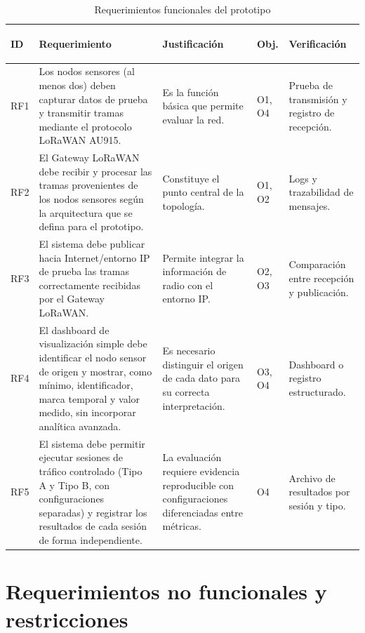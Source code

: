 \documentclass[12pt,oneside,openany,spanish,oldfontcommands]{memoir}
\begin{document}
\begin{table}[H]
\centering
\caption{Requerimientos funcionales del prototipo}
\label{tab:rf}
\scriptsize
\begin{tabularx}{\textwidth}{
  >{\bfseries\raggedright\arraybackslash}p{0.8cm}
  >{\raggedright\arraybackslash}X
  >{\raggedright\arraybackslash}p{2.5cm}
  >{\raggedright\arraybackslash}p{1.4cm}
  >{\raggedright\arraybackslash}p{2.4cm}
}
\toprule
\textbf{ID} &
\textbf{Requerimiento} &
\textbf{Justificación} &
\textbf{Obj.} &
\textbf{Verificación}\\
\midrule
RF1 &
Los nodos sensores (al menos dos) deben capturar datos de prueba y transmitir tramas
mediante el protocolo LoRaWAN AU915.
&
Es la función básica que permite evaluar la red.
&
O1, O4
&
Prueba de transmisión y registro de recepción.
\\
\midrule
RF2 &
El Gateway LoRaWAN debe recibir y procesar las tramas provenientes de los nodos sensores
según la arquitectura que se defina para el prototipo.
&
Constituye el punto central de la topología.
&
O1, O2
&
Logs y trazabilidad de mensajes.
\\
\midrule
RF3 &
El sistema debe publicar hacia Internet/entorno IP de prueba las tramas correctamente
recibidas por el Gateway LoRaWAN.
&
Permite integrar la información de radio con el entorno IP.
&
O2, O3
&
Comparación entre recepción y publicación.
\\
\midrule
RF4 &
El dashboard de visualización simple debe identificar el nodo sensor de origen y mostrar,
como mínimo, identificador, marca temporal y valor medido, sin incorporar analítica
avanzada.
&
Es necesario distinguir el origen de cada dato para su correcta interpretación.
&
O3, O4
&
Dashboard o registro estructurado.
\\
\midrule
RF5 &
El sistema debe permitir ejecutar sesiones de tráfico controlado (Tipo A y Tipo B,
con configuraciones separadas) y registrar los resultados de cada sesión de forma
independiente.
&
La evaluación requiere evidencia reproducible con configuraciones diferenciadas entre métricas.
&
O4
&
Archivo de resultados por sesión y tipo.
\\
\bottomrule
\end{tabularx}
\end{table}

\section{Requerimientos no funcionales y restricciones}
\end{document}
